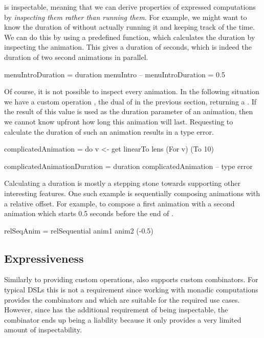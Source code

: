 \dsl{} is inspectable, meaning that we can derive properties of expressed computations by \emph{inspecting them rather than running them}. For example, we might want to know the duration of  without actually running it and keeping track of the time. We can do this by using a predefined  function, which calculates the duration by inspecting the animation. This gives a duration of  seconds, which is indeed the duration of two  second animations in parallel.

\begin{spec}
menuIntroDuration = duration menuIntro
-- menuIntroDuration = 0.5 
\end{spec}

Of course, it is not possible to inspect every animation. In the following situation we have a custom operation , the dual of  in the previous section, returning a . If the result of this value is used as the duration parameter of an animation, then we cannot know upfront how long this animation will last. Requesting to calculate the duration of such an animation results in a type error.

\begin{spec}
complicatedAnimation = do
  v <- get
  linearTo lens (For v) (To 10)

complicatedAnimationDuration = duration complicatedAnimation
-- type error
\end{spec}

Calculating a duration is mostly a stepping stone towards supporting other interesting features. One such example is sequentially composing animations with a relative offset. For example, to compose a first animation  with a second animation  which starts 0.5 seconds before the end of .

\begin{spec}
relSeqAnim = relSequential anim1 anim2 (-0.5)
\end{spec}

\subsection{Expressiveness}
\label{sec:customcomb}

Similarly to providing custom operations, \dsl{} also supports custom combinators. For typical DSLs this is not a requirement since working with monadic computations provides the combinators \hs{>>=} and  which are suitable for the required use cases. However, since \dsl{} has the additional requirement of being inspectable, the \hs{>>=} combinator ends up being a liability because it only provides a very limited amount of inspectability.


